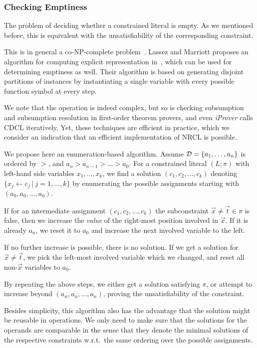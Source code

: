 \documentclass[a4paper]{article}
\begin{document}
\subsubsection*{Checking Emptiness}

The problem of deciding whether a constrained literal is empty. As we mentioned before, this is equivalent with the unsatisfiability of the corresponding constraint. 

This is in general a co-NP-complete problem~\cite{Comon91}\cite{LassezM87}. 
Lassez and Marriott proposes an algorithm for computing explicit representation in~\cite{LassezM87}, which can be used for determining emptiness as well. 
Their algorithm is based on generating disjoint partitions of instances by instantiating a single variable with every possible function symbol at every step.

We note that the operation is indeed complex, 
but so is checking subsumption and subsumption resolution in first-order theorem provers, 
and even \emph{iProver} calls CDCL iteratively. 
Yet, these techniques are efficient in practice, which we consider an indication that 
an efficient implementation of NRCL is possible. 

We propose here an enumeration-based algorithm. 
Assume $\mathcal{D} = \{a_1, \dots, a_n\}$ is ordered by $>$,
 and $a_n > a_{n-1} > \dots > a_0$.
For a constrained literal $(L; \pi)$ with left-hand side variables $x_1, \dots, x_k$, we 
find a solution $(c_1, c_2, \dots, c_k)$ denoting $\{ x_j \gets c_j~|~j = 1, \dots, k\}$ by
enumerating the possible assignments starting with $(a_0, a_0, \dots, a_0)$.

If for an intermediate assignment $(c_1, c_2, \dots, c_k)$ the subconstraint $\vec{x} \ne \vec{t} \in \pi$
is false, then we increase the \emph{value} of the right-most position involved in $\vec{x}$.
If it is already $a_n$, we reset it to $a_0$ and increase the next involved variable to the left. 

If no further increase is possible, there is no solution. 
If we get a solution for $\vec{x} \ne \vec{t}$, we pick the 
left-most involved variable which we changed, and reset all non-$\vec{x}$ variables to $a_0$.

By repeating the above steps, we either get a solution satisfying $\pi$, or attempt to increase beyond $(a_n, a_n, \dots, a_n)$, proving the 
unsatisfiability of the constraint.

Besides simplicity, this algorithm also has the advantage that the solution might be reusable in operations. 
We only need to make sure that the solutions for the operands are comparable in the sense that 
they denote the minimal solutions of the respective constraints w.r.t.\
the same ordering over the possible assignments.
\end{document}
